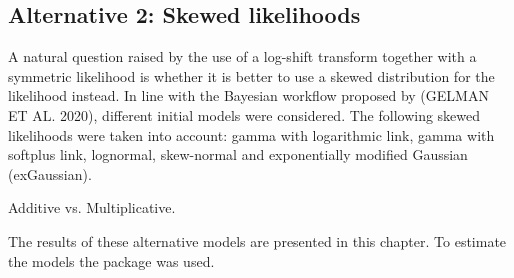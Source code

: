 \subsection{Alternative 2: Skewed likelihoods}
\label{ch:skewed_likelihoods}
A natural question raised by the use of a log-shift transform together with a symmetric likelihood is whether it is better to use a skewed distribution for the likelihood instead.
In line with the Bayesian workflow proposed by (GELMAN ET AL. 2020), different initial models were considered.
The following skewed likelihoods were taken into account: gamma with logarithmic link, gamma with
softplus link, lognormal, skew-normal and exponentially modified Gaussian (exGaussian).

Additive vs. Multiplicative.

The results of these alternative models are presented in this chapter.
To estimate the models the package  was used.

